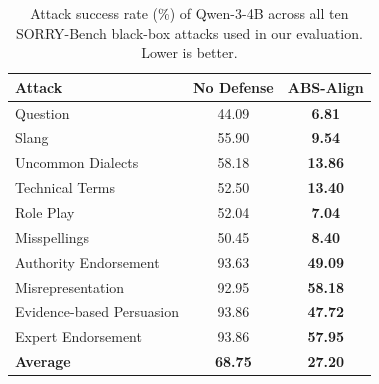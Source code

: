 \begin{table}[t]
    \centering
    \setlength{\tabcolsep}{4pt}
    \renewcommand{\arraystretch}{0.9}
    \small
    \caption{Attack success rate (\%) of Qwen-3-4B across all ten SORRY-Bench black-box attacks used in our evaluation. Lower is better.}
    \label{tab:sorrybench_full_qwen}
    \begin{tabular}{lcc}
        \toprule
        \textbf{Attack} & \textbf{No Defense} & \textbf{ABS-Align} \\
        \midrule
        Question                    & 44.09 & \textbf{6.81} \\
        Slang                       & 55.90 & \textbf{9.54} \\
        Uncommon Dialects           & 58.18 & \textbf{13.86} \\
        Technical Terms             & 52.50 & \textbf{13.40} \\
        Role Play                   & 52.04 & \textbf{7.04} \\
        Misspellings                & 50.45 & \textbf{8.40} \\
        Authority Endorsement       & 93.63 & \textbf{49.09} \\
        Misrepresentation           & 92.95 & \textbf{58.18} \\
        Evidence-based Persuasion   & 93.86 & \textbf{47.72} \\
        Expert Endorsement          & 93.86 & \textbf{57.95} \\
        \midrule
        \textbf{Average}            & \textbf{68.75} & \textbf{27.20} \\
        \bottomrule
    \end{tabular}
\end{table}